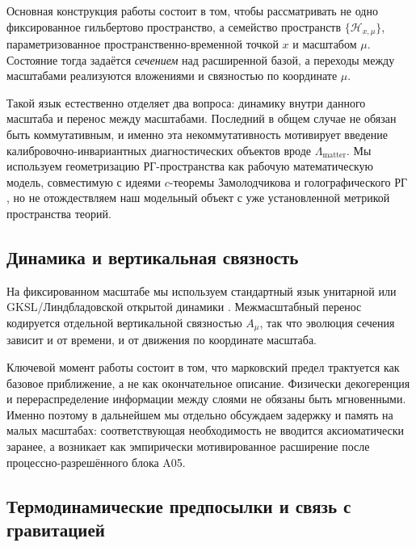 \documentclass[11pt,a4paper]{article}
\theoremstyle{definition}
\theoremstyle{plain}
\theoremstyle{remark}
\begin{document}
Основная конструкция работы состоит в том, чтобы рассматривать не одно фиксированное гильбертово пространство, а семейство пространств
$\{\mathcal H_{x,\mu}\}$, параметризованное пространственно-временной точкой $x$ и масштабом $\mu$.
Состояние тогда задаётся \emph{сечением} над расширенной базой, а переходы между масштабами реализуются вложениями и связностью по координате $\mu$.

Такой язык естественно отделяет два вопроса: динамику внутри данного масштаба и перенос между масштабами.
Последний в общем случае не обязан быть коммутативным, и именно эта некоммутативность мотивирует введение калибровочно-инвариантных диагностических объектов вроде $\Lambda_{\mathrm{matter}}$.
Мы используем геометризацию РГ-пространства как рабочую математическую модель, совместимую с идеями $c$-теоремы Замолодчикова и голографического РГ \cite{Zamolodchikov1986Irreversibility,deBoerVerlindeVerlinde2000HolographicRG,RandallSundrum1999LargeHierarchy,RandallSundrum1999Alternative}, но не отождествляем наш модельный объект с уже установленной метрикой пространства теорий.

\subsection{Динамика и вертикальная связность}

На фиксированном масштабе мы используем стандартный язык унитарной или GKSL/Линдбладовской открытой динамики \cite{GoriniKossakowskiSudarshan1976GKSL,Lindblad1976Generators,Kraus1983StatesEffectsOperations,Stinespring1955PositiveFunctions,NielsenChuang2000QCQI,BreuerPetruccione2002OpenQuantum}. Межмасштабный перенос кодируется отдельной вертикальной связностью $A_\mu$, так что эволюция сечения зависит и от времени, и от движения по координате масштаба.

Ключевой момент работы состоит в том, что марковский предел трактуется как базовое приближение, а не как окончательное описание. Физически декогеренция и перераспределение информации между слоями не обязаны быть мгновенными. Именно поэтому в дальнейшем мы отдельно обсуждаем задержку и память на малых масштабах: соответствующая необходимость не вводится аксиоматически заранее, а возникает как эмпирически мотивированное расширение после процессно-разрешённого блока A05.

\subsection{Термодинамические предпосылки и связь с гравитацией}
\end{document}
